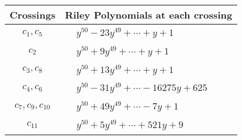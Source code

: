 \documentclass[1p]{elsarticle_modified}
\theoremstyle{definition}
\begin{document}
\begin{tabular}{m{50pt}|m{274pt}}
Crossings & \hspace{64pt}Riley Polynomials at each crossing \\
\hline $$\begin{aligned}c_{1},c_{5}\end{aligned}$$&$\begin{aligned}
&y^{50}-23 y^{49}+\cdots+y+1
\end{aligned}$\\
\hline $$\begin{aligned}c_{2}\end{aligned}$$&$\begin{aligned}
&y^{50}+9 y^{49}+\cdots+y+1
\end{aligned}$\\
\hline $$\begin{aligned}c_{3},c_{8}\end{aligned}$$&$\begin{aligned}
&y^{50}+13 y^{49}+\cdots+y+1
\end{aligned}$\\
\hline $$\begin{aligned}c_{4},c_{6}\end{aligned}$$&$\begin{aligned}
&y^{50}-31 y^{49}+\cdots-16275 y+625
\end{aligned}$\\
\hline $$\begin{aligned}c_{7},c_{9},c_{10}\end{aligned}$$&$\begin{aligned}
&y^{50}+49 y^{49}+\cdots-7 y+1
\end{aligned}$\\
\hline $$\begin{aligned}c_{11}\end{aligned}$$&$\begin{aligned}
&y^{50}+5 y^{49}+\cdots+521 y+9
\end{aligned}$\\
\hline
\end{tabular}
\vskip 2pc
\end{document}
